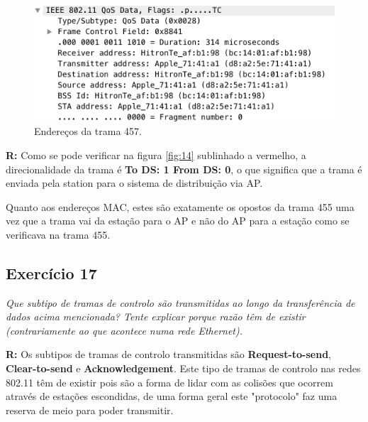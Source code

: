 \documentclass{llncs}
\begin{document}
\begin{figure}[H]
\begin{center}
\includegraphics[scale=0.30]{16_2.png} 
\end{center}
\caption{\label{fig:16_2}Endereços da trama 457.}
\end{figure} 
\par
\textbf{R:} Como se pode verificar na figura \ref{fig:14} sublinhado a vermelho, a direcionalidade da trama é \textbf{To DS: 1 From DS: 0}, o que significa que a trama é enviada pela station para o sistema de distribuição via AP.

Quanto aos endereços MAC, estes são exatamente os opostos da trama 455 uma vez que a trama vai da estação para o AP e não do AP para a estação como se verificava na trama 455.


\subsection{Exercício 17}
\emph{Que subtipo de tramas de controlo são transmitidas ao longo da transferência de dados acima mencionada? Tente explicar porque razão têm de existir (contrariamente ao que acontece numa rede Ethernet).}
\\ \par
\textbf{R:} Os subtipos de tramas de controlo transmitidas são \textbf{Request-to-send},  \textbf{Clear-to-send} e \textbf{Acknowledgement}. Este tipo de tramas de controlo nas redes 802.11 têm de existir pois são a forma de lidar com as colisões que ocorrem através de estações escondidas, de uma forma geral este "protocolo" faz uma reserva de meio para poder transmitir.
\end{document}
